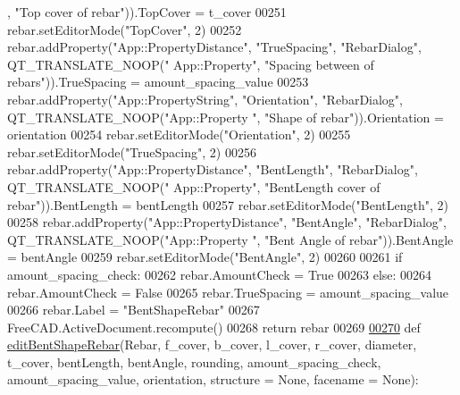 \begin{DoxyCode}
      , \textcolor{stringliteral}{"Top cover of rebar"})).TopCover = t\_cover
00251     rebar.setEditorMode(\textcolor{stringliteral}{"TopCover"}, 2)
00252     rebar.addProperty(\textcolor{stringliteral}{"App::PropertyDistance"}, \textcolor{stringliteral}{"TrueSpacing"}, \textcolor{stringliteral}{"RebarDialog"}, QT\_TRANSLATE\_NOOP(\textcolor{stringliteral}{"
      App::Property"}, \textcolor{stringliteral}{"Spacing between of rebars"})).TrueSpacing = amount\_spacing\_value
00253     rebar.addProperty(\textcolor{stringliteral}{"App::PropertyString"}, \textcolor{stringliteral}{"Orientation"}, \textcolor{stringliteral}{"RebarDialog"}, QT\_TRANSLATE\_NOOP(\textcolor{stringliteral}{"App::Property
      "}, \textcolor{stringliteral}{"Shape of rebar"})).Orientation = orientation
00254     rebar.setEditorMode(\textcolor{stringliteral}{"Orientation"}, 2)
00255     rebar.setEditorMode(\textcolor{stringliteral}{"TrueSpacing"}, 2)
00256     rebar.addProperty(\textcolor{stringliteral}{"App::PropertyDistance"}, \textcolor{stringliteral}{"BentLength"}, \textcolor{stringliteral}{"RebarDialog"}, QT\_TRANSLATE\_NOOP(\textcolor{stringliteral}{"
      App::Property"}, \textcolor{stringliteral}{"BentLength cover of rebar"})).BentLength = bentLength
00257     rebar.setEditorMode(\textcolor{stringliteral}{"BentLength"}, 2)
00258     rebar.addProperty(\textcolor{stringliteral}{"App::PropertyDistance"}, \textcolor{stringliteral}{"BentAngle"}, \textcolor{stringliteral}{"RebarDialog"}, QT\_TRANSLATE\_NOOP(\textcolor{stringliteral}{"App::Property
      "}, \textcolor{stringliteral}{"Bent Angle of rebar"})).BentAngle = bentAngle
00259     rebar.setEditorMode(\textcolor{stringliteral}{"BentAngle"}, 2)
00260 
00261     \textcolor{keywordflow}{if} amount\_spacing\_check:
00262         rebar.AmountCheck = \textcolor{keyword}{True}
00263     \textcolor{keywordflow}{else}:
00264         rebar.AmountCheck = \textcolor{keyword}{False}
00265         rebar.TrueSpacing = amount\_spacing\_value
00266     rebar.Label = \textcolor{stringliteral}{"BentShapeRebar"}
00267     FreeCAD.ActiveDocument.recompute()
00268     \textcolor{keywordflow}{return} rebar
00269 
\hypertarget{BentShapeRebar_8py_source.tex_l00270}{}\hyperlink{namespaceBentShapeRebar_a941d005845cd497c0beb12bb8fef9171}{00270} \textcolor{keyword}{def }\hyperlink{namespaceBentShapeRebar_a941d005845cd497c0beb12bb8fef9171}{editBentShapeRebar}(Rebar, f\_cover, b\_cover, l\_cover, r\_cover, diameter, t\_cover, 
      bentLength, bentAngle, rounding, amount\_spacing\_check, amount\_spacing\_value, orientation, structure = None, 
      facename = None):

\end{DoxyCode}
